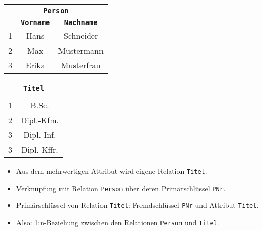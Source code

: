 \begin{frame}[t]\frametitle{\insertsection}
\framesubtitle{\insertsubsection}
\begin{center}
\begin{tabular}{|c|c|c|}\hline
	\multicolumn{3}{|c|}{\small \textbf{\texttt{Person}}}\\\hline\hline
	\small \textbf{\key{\texttt{PNr}}} & \small \textbf{\texttt{Vorname}}&\small\textbf{\texttt{Nachname}} \\\hline 
	\small 1 & \small Hans &\small Schneider  \\\hline 
	\small 2 & \small Max &\small Mustermann \\\hline 
	\small 3 & \small Erika &\small Musterfrau  \\\hline 
\end{tabular}
\hspace{3mm}
\begin{tabular}{|c|c|}\hline
	\multicolumn{2}{|c|}{\small \textbf{\texttt{Titel}}}\\\hline\hline
	\small \textbf{\key{\texttt{PNr}}} & \small \textbf{\key{\texttt{Titel}}}\\\hline 
	\small 1 & \small B.Sc. \\\hline 
	\small 2 & \small Dipl.-Kfm.  \\\hline 
	\small 3 & \small Dipl.-Inf. \\\hline 
	\small 3 & \small Dipl.-Kffr. \\\hline 
\end{tabular}
\end{center}
\begin{itemize}
\item Aus dem mehrwertigen Attribut wird eigene Relation \texttt{Titel}.
\item Verkn\"upfung mit Relation \texttt{Person} \"uber deren Prim\"arschl\"ussel \texttt{PNr}.
\item	Prim\"arschl\"ussel von Relation \texttt{Titel}: Fremdschl\"ussel \texttt{PNr} und Attribut \texttt{Titel}.
\item Also: 1:n-Beziehung zwischen den Relationen \texttt{Person} und \texttt{Titel}.
\end{itemize}
\end{frame}

